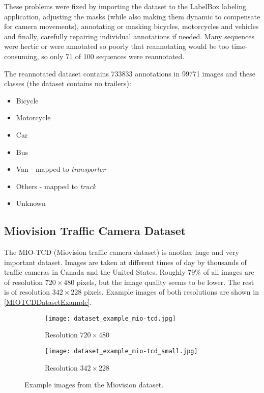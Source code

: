 These problems were fixed by importing the dataset to the LabelBox labeling
application, adjusting the masks (while also making them dynamic to compensate
for camera movements), annotating or masking bicycles, motorcycles and
 vehicles and finally, carefully repairing individual annotations if
needed. Many sequences were hectic or were annotated so poorly that reannotating
would be too time-consuming, so only 71 of 100 sequences were reannotated.

The reannotated dataset contains \num{733833} annotations in \num{99771}
images and these classes (the dataset contains no trailers):
\begin{itemize}
    \item Bicycle
    \item Motorcycle
    \item Car
    \item Bus
    \item Van - mapped to \textit{transporter}
    \item Others - mapped to \textit{truck}
    \item Unknown
\end{itemize}


\subsection{Miovision Traffic Camera Dataset}

The MIO-TCD (Miovision traffic camera dataset) \cite{MIO2018} is another huge
and very important dataset. Images are taken at different times of day by
thousands of traffic cameras in Canada and the United States. Roughly $79\%$ of
all images are of resolution $720 \times 480$ pixels, but the image quality
seems to be lower. The rest is of resolution $342 \times 228$ pixels. Example images of
both resolutions are shown in \autoref{MIOTCDDatasetExample}.

\begin{figure}[h]
    \centering
    \begin{subfigure}[b]{0.475\textwidth}
        \texttt{[image: dataset\_example\_mio-tcd.jpg]}
        \caption{Resolution $720 \times 480$}
    \end{subfigure}
    \begin{subfigure}[b]{0.475\textwidth}
        \texttt{[image: dataset\_example\_mio-tcd\_small.jpg]}
        \caption{Resolution $342 \times 228$}
    \end{subfigure}
    \caption{Example images from the Miovision dataset.}
    \label{MIOTCDDatasetExample}
\end{figure}

